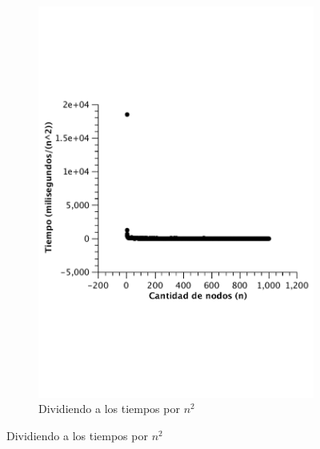 \begin{figure}[H]
        \centering
        \begin{subfigure}[b]{0.5\textwidth}
                \includegraphics[width=\textwidth]{imagenes/completo-matriz-3.pdf}
                \caption{Dividiendo a los tiempos por $n^2$}
        \end{subfigure}


\end{figure}
